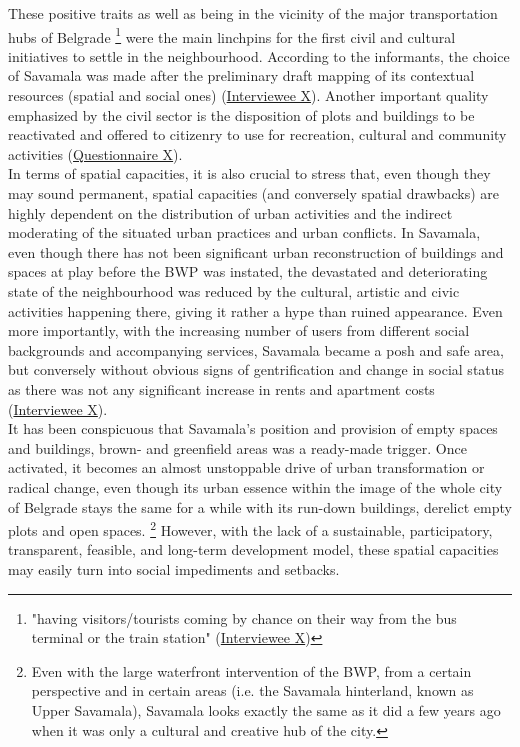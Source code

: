 \documentclass[11pt]{report}
\begin{document}
{{{{These positive traits as well as being in the vicinity of the major transportation hubs of Belgrade
\footnote{"having visitors/tourists coming by chance on their way from the bus terminal or the train station" (\href{InterviewX}{Interviewee X})}
were the main linchpins for the first civil and cultural initiatives to settle in the neighbourhood. According to the informants, the choice of Savamala was made after the preliminary draft mapping of its contextual resources (spatial and social ones) (\href{InterviewX}{Interviewee X}).
Another important quality emphasized by the civil sector is the disposition of plots and buildings to be reactivated and offered to citizenry to use for recreation, cultural and community activities (\href{Questionnaire Students Savamala}{Questionnaire X}).
\\

In terms of spatial capacities, it is also crucial to stress that, even though they may sound permanent, spatial capacities (and conversely spatial drawbacks) are highly dependent on the distribution of urban activities and the indirect moderating of the situated urban practices and urban conflicts. In Savamala, even though there has not been significant urban reconstruction of buildings and spaces at play before the BWP was instated, the devastated and deteriorating state of the neighbourhood was reduced by the cultural, artistic and civic activities happening there, giving it rather a hype than ruined appearance. Even more importantly, with the increasing number of users from different social backgrounds and accompanying services, Savamala became a posh and safe area, but conversely without obvious signs of gentrification and change in  social status as there was not any significant increase in rents and apartment costs
(\href{InterviewX}{Interviewee X}).
\\

It has been conspicuous that Savamala’s position and provision of empty spaces and buildings, brown- and greenfield areas was a ready-made trigger. Once activated, it becomes an almost unstoppable drive of urban transformation or radical change, even though its urban essence within the image of the whole city of Belgrade stays the same for a while with its run-down buildings, derelict empty plots and open spaces.
\footnote{Even with the large waterfront intervention of the BWP, from a certain perspective and in certain areas (i.e. the Savamala hinterland, known as Upper Savamala), Savamala looks exactly the same as it did a few years ago when it was only a cultural and creative hub of the city.}
However, with the lack of a sustainable, participatory, transparent, feasible, and long-term development model, these spatial capacities may easily turn into social impediments and setbacks.

}}}}
\end{document}
